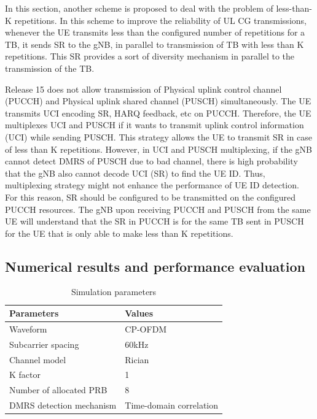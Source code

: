 \documentclass{report}
\begin{document}
In this section, another scheme is proposed to deal with the problem of less-than-K repetitions. In this scheme to improve the reliability of UL CG transmissions, whenever the UE transmits less than the configured number of repetitions for a TB, it sends SR to the gNB, in parallel to transmission of TB with less than K repetitions. This SR provides a sort of diversity mechanism in parallel to the transmission of the TB.

Release 15 does not allow transmission of Physical uplink control channel (PUCCH) and Physical uplink shared channel (PUSCH) simultaneously. The UE transmits UCI encoding SR, HARQ feedback, etc on PUCCH. Therefore, the UE multiplexes UCI and PUSCH if it wants to transmit uplink control information (UCI) while sending PUSCH. This strategy allows the UE to transmit SR in case of less than K repetitions. However, in UCI and PUSCH  multiplexing, if the gNB cannot detect DMRS of PUSCH due to bad channel, there is high probability that the gNB also cannot decode UCI (SR) to find the UE ID. Thus, multiplexing strategy might not enhance the performance of UE ID detection. For this reason, SR should be configured to be transmitted on the configured PUCCH resources. The gNB upon receiving PUCCH and PUSCH from the same UE will understand that the SR in PUCCH is for the same TB sent in PUSCH for the UE that is only able to make less than K repetitions.

\subsection{Numerical results and performance evaluation}

\begin{table}[htbp]
\caption{Simulation parameters}
\begin{center}
\begin{tabular}{|p{8em}|p{8em}|}
 \hline
 \textbf{Parameters} & \textbf{Values}\\
 \hline
 Waveform & CP-OFDM\\
 \hline
 Subcarrier spacing & 60kHz\\
 \hline
 Channel model & Rician\\
 \hline
 K factor & 1\\
 \hline
 Number of allocated PRB & 8\\
 \hline
 DMRS detection mechanism & Time-domain correlation\\
 

 
 \hline
\end{tabular}
\label{tab11}
\end{center}

\end{table}
\end{document}
